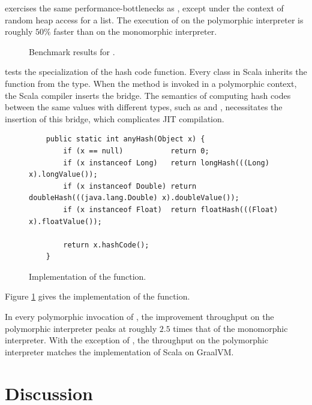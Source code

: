  exercises the same performance-bottlenecks as , except under the context of random heap access for a list.
The execution of  on the polymorphic interpreter is roughly $50\%$ faster than on the monomorphic interpreter.

\begin{figure}[!htb]
	\centering
	
	\caption{Benchmark results for .}
\end{figure}

 tests the specialization of the hash code function.
Every class in Scala inherits the  function from the  type.
When the  method is invoked in a polymorphic context, the Scala compiler inserts the  bridge.
The semantics of computing hash codes between the same values with different types, such as  and , necessitates the insertion of this bridge, which complicates JIT compilation.

\begin{figure}[!htb]
\begin{verbatim}
	public static int anyHash(Object x) {
		if (x == null)           return 0;
		if (x instanceof Long)   return longHash(((Long) x).longValue());
		if (x instanceof Double) return doubleHash(((java.lang.Double) x).doubleValue());
		if (x instanceof Float)  return floatHash(((Float) x).floatValue());
		
		return x.hashCode();
	}
\end{verbatim}
\caption{Implementation of the  function.}
\label{impl:anyHash}
\end{figure}


Figure \ref{impl:anyHash} gives the implementation of the  function.

In every polymorphic invocation of , the improvement throughput on the polymorphic interpreter peaks at roughly $2.5$ times that of the monomorphic interpreter.
With the exception of , the throughput on the polymorphic interpreter matches the implementation of Scala on GraalVM.

\section{Discussion}

